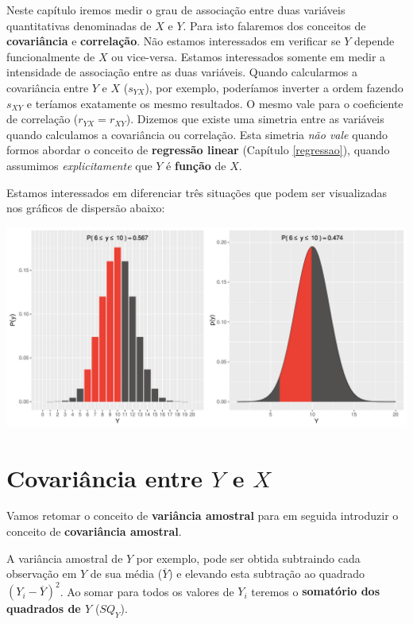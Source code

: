 \documentclass[
]{book}
\begin{document}
Neste capítulo iremos medir o grau de associação entre duas variáveis quantitativas denominadas de \(X\) e \(Y\). Para isto falaremos dos conceitos de \textbf{covariância} e \textbf{correlação}. Não estamos interessados em verificar se \(Y\) depende funcionalmente de \(X\) ou vice-versa. Estamos interessados somente em medir a intensidade de associação entre as duas variáveis. Quando calcularmos a covariância entre \(Y\) e \(X\) (\(s_{YX}\)), por exemplo, poderíamos inverter a ordem fazendo \(s_{XY}\) e teríamos exatamente os mesmo resultados. O mesmo vale para o coeficiente de correlação (\(r_{YX} = r_{XY}\)). Dizemos que existe uma simetria entre as variáveis quando calculamos a covariância ou correlação. Esta simetria \emph{não vale} quando formos abordar o conceito de \textbf{regressão linear} (Capítulo \ref{regressao}), quando assumimos \emph{explicitamente} que \(Y\) é \textbf{função} de \(X\).

Estamos interessados em diferenciar três situações que podem ser visualizadas nos gráficos de dispersão abaixo:

\begin{center}\includegraphics{probest-cambientais_files/figure-latex/unnamed-chunk-203-1} \end{center}

\hypertarget{covariuxe2ncia-entre-y-e-x}{%
\section{\texorpdfstring{Covariância entre \(Y\) e \(X\)}{Covariância entre Y e X}}\label{covariuxe2ncia-entre-y-e-x}}

Vamos retomar o conceito de \textbf{variância amostral} para em seguida introduzir o conceito de \textbf{covariância amostral}.

A variância amostral de \(Y\) por exemplo, pode ser obtida subtraindo cada observação em \(Y\) de sua média (\(\overline{Y}\)) e elevando esta subtração ao quadrado \((Y_i - \overline{Y})^2\). Ao somar para todos os valores de \(Y_i\) teremos o \textbf{somatório dos quadrados de \(Y\)} (\(SQ_Y\)).
\end{document}
